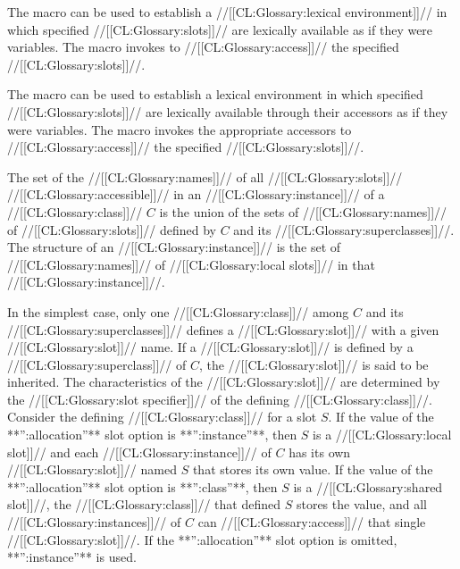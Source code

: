 The macro  can be used to establish a  //[[CL:Glossary:lexical environment]]// in which specified //[[CL:Glossary:slots]]// are lexically available as if they were variables.  The macro   invokes  to //[[CL:Glossary:access]]// the specified //[[CL:Glossary:slots]]//.

The macro  can be used to establish a lexical environment in which specified //[[CL:Glossary:slots]]// are lexically available through their accessors as if they were variables.  The macro  invokes the appropriate accessors to //[[CL:Glossary:access]]// the specified //[[CL:Glossary:slots]]//. 

\endsubSection%

The set of the //[[CL:Glossary:names]]// of all //[[CL:Glossary:slots]]// //[[CL:Glossary:accessible]]//  in an //[[CL:Glossary:instance]]// of a //[[CL:Glossary:class]]// $C$ is the union of  the sets of //[[CL:Glossary:names]]// of //[[CL:Glossary:slots]]// defined by $C$ and its //[[CL:Glossary:superclasses]]//. The structure of an //[[CL:Glossary:instance]]// is the set of //[[CL:Glossary:names]]// of //[[CL:Glossary:local slots]]// in that //[[CL:Glossary:instance]]//.

In the simplest case, only one //[[CL:Glossary:class]]// among $C$ and its //[[CL:Glossary:superclasses]]// defines a //[[CL:Glossary:slot]]// with a given //[[CL:Glossary:slot]]// name.   If a //[[CL:Glossary:slot]]// is defined by a //[[CL:Glossary:superclass]]// of $C$\negthinspace,  the //[[CL:Glossary:slot]]// is said to be inherited.  The characteristics  of the //[[CL:Glossary:slot]]// are determined by the //[[CL:Glossary:slot specifier]]// of the defining //[[CL:Glossary:class]]//. Consider the defining //[[CL:Glossary:class]]// for a slot $S$\negthinspace.  If the value of the **'':allocation''**  slot option is **'':instance''**, then $S$ is a //[[CL:Glossary:local slot]]// and each  //[[CL:Glossary:instance]]// of $C$ has its own //[[CL:Glossary:slot]]// named $S$ that stores its own value.  If the value of the **'':allocation''** slot  option is **'':class''**, then $S$ is a //[[CL:Glossary:shared slot]]//, the //[[CL:Glossary:class]]//  that defined $S$ stores the value, and all //[[CL:Glossary:instances]]// of $C$ can //[[CL:Glossary:access]]// that single //[[CL:Glossary:slot]]//.   If the **'':allocation''** slot option is omitted, **'':instance''** is used.

